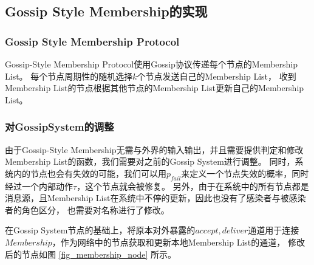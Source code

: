 \subsection{Gossip Style Membership的实现}

\subsubsection{Gossip Style Membership Protocol}
Gossip-Style Membership Protocol使用Gossip协议传递每个节点的Membership List。
每个节点周期性的随机选择$k$个节点发送自己的Membership List，
收到Membership List的节点根据其他节点的Membership List更新自己的Membership List。

\subsubsection{对GossipSystem的调整}
由于Gossip-Style Membership无需与外界的输入输出，并且需要提供判定和修改Membership List的函数，我们需要对之前的Gossip System进行调整。
同时，系统内的节点也会有失效的可能，我们可以用$p_{fail}$来定义一个节点失效的概率，同时经过一个内部动作$\tau$，这个节点就会被修复。
另外，由于在系统中的所有节点都是消息源，且Membership List在系统中不停的更新，因此也没有了感染者与被感染者的角色区分，
也需要对名称进行了修改。

在Gossip System节点的基础上，将原本对外暴露的$accept,deliver$通道用于连接$Membership$，作为网络中的节点获取和更新本地Membership List的通道，
修改后的节点如图
\ref{fig_membership_node}
所示。

